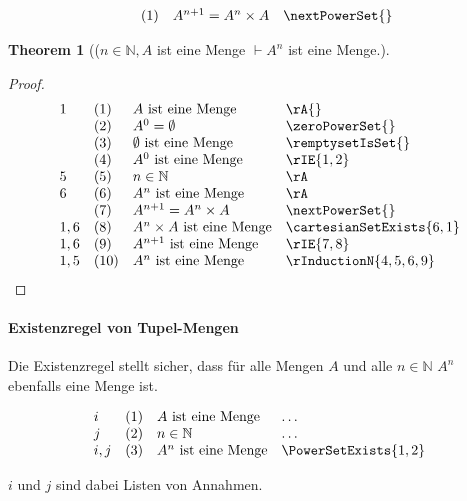 \documentclass{book}
\theoremstyle{plain}
\newtheorem{theorem}{Theorem}
\theoremstyle{remark}
\theoremstyle{definition}
\begin{document}
\[
\begin{array}{llll}
	& (1) & A^{n+1}=A^n\times A & \nextPowerSet{} \\
\end{array}
\]

\begin{theorem}[(\(n\in\mathbb{N}, A\) ist eine Menge \(\vdash A^n\) ist eine Menge.]
\end{theorem}
\begin{proof}
	\[
	\begin{array}{llll}
		  1 &  (1) & A \text{ ist eine Menge} & \rA{} \\
            &  (2) & A^0=\emptyset & \zeroPowerSet{} \\
            &  (3) & \emptyset \text{ ist eine Menge} & \remptysetIsSet{} \\
            &  (4) & A^0 \text{ ist eine Menge} & \rIE{1,2} \\
            5 &  (5) & n\in\mathbb{N} & \rA \\
            6 &  (6) & A^n \text{ ist eine Menge} & \rA \\
              &  (7) & A^{n+1}=A^n\times A & \nextPowerSet{}  \\
            1,6  &  (8) & A^n\times A \text{ ist eine Menge} & \cartesianSetExists{6,1}  \\
            1,6  &  (9) & A^{n+1} \text{ ist eine Menge} & \rIE{7,8}  \\
            1,5  &  (10) & A^{n} \text{ ist eine Menge} & \rInductionN{4,5,6,9}  \\
	\end{array}
	\]
\end{proof}

\paragraph{Existenzregel von Tupel-Mengen}
\label{rule:PowerSetExists}
Die Existenzregel stellt sicher, dass für alle Mengen \(A\) und alle \(n\in\mathbb{N}\) \(A^{n}\) ebenfalls eine Menge ist.

\[
\begin{array}{llll}
	i & (1) & A \text{ ist eine Menge} & \dots  \\
        j & (2) & n\in\mathbb{N} & \dots  \\
	i,j & (3) & A^n\text{ ist eine Menge} & \PowerSetExists{1,2} \\
\end{array}
\]

\(i\) und \(j\) sind dabei Listen von Annahmen.
\end{document}
